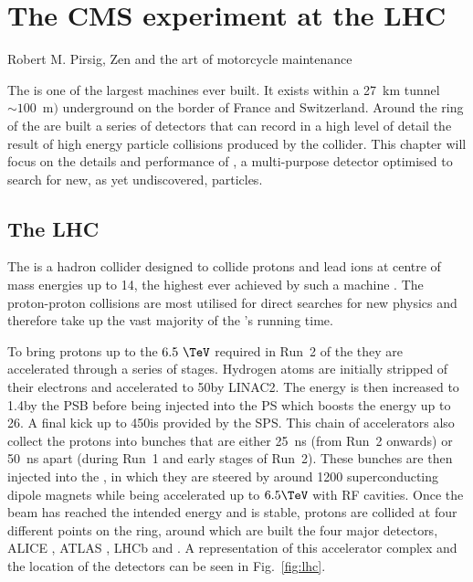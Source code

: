 \chapter{The CMS experiment at the LHC}
\label{chap:detector}

%
{Robert M. Pirsig, Zen and the art of motorcycle maintenance}

The \LHC is one of the largest machines ever built. It exists within a
27~km tunnel $\sim 100$~m$)$ underground on the border of France and
Switzerland. Around the ring of the \LHC are built a series of
detectors that can record in a high level of detail the result of high
energy particle collisions produced by the collider. This chapter
will focus on the details and performance of \CMS, a multi-purpose
detector optimised to search for new, as yet undiscovered, particles.

\section{The LHC}
\label{sec:lhc}

The \LHC is a hadron collider designed to collide protons and lead
ions at centre of mass energies up to 14\tev, the highest ever achieved by such a
machine
\cite{Evans:2008zzb,CERN-2004-003-V-1,CERN-2004-003-V-2,CERN-2004-003-V-3}.
The proton-proton collisions are most utilised for direct searches for
new physics and therefore take up the vast majority of the \LHC's
running time. 

To bring protons up to the $6.5~\tev$ required in Run~2 of the \LHC
they are accelerated through a series of stages. Hydrogen atoms are
initially stripped of their electrons and accelerated to 50\mev by
\ac{LINAC2}. The energy is then increased to 1.4\gev by the \ac{PSB}
before being injected into the \ac{PS} which boosts the energy up to
26\gev. A final kick up to 450\gev is provided by the \ac{SPS}. This
chain of accelerators also collect the protons into bunches that are
either 25~ns (from Run~2 onwards) or 50~ns apart (during Run~1 and
early stages of Run~2). These bunches are then injected into the \LHC,
in which they are steered by around 1200 superconducting dipole
magnets while being accelerated up to $6.5\tev$ with \ac{RF} cavities.
Once the beam has reached the intended energy and is stable, protons
are collided at four different points on the ring, around which are
built the four major \LHC detectors, ALICE \cite{Aamodt:2008zz}, ATLAS
\cite{Aad:2008zzm}, LHCb \cite{Alves:2008zz} and \CMS
\cite{Chatrchyan:2008aa}.  A representation of this accelerator
complex and the location of the detectors can be seen in
Fig.~\ref{fig:lhc}.

